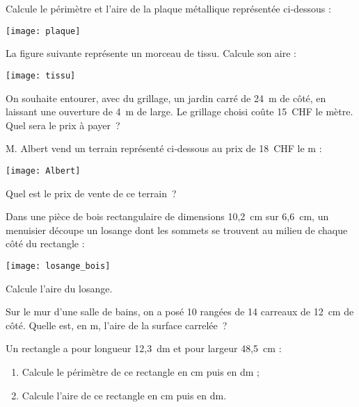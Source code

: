 \begin{exercice}
Calcule le périmètre et l'aire de la plaque métallique représentée ci‑dessous :
\begin{center} \texttt{[image: plaque]} \end{center}
\end{exercice}


\begin{exercice}
La figure suivante représente un morceau de tissu. Calcule son aire :
\begin{center} \texttt{[image: tissu]} \end{center}
\end{exercice}


\begin{exercice}
On souhaite entourer, avec du grillage, un jardin carré de 24 m de côté, en laissant une ouverture de 4 m de large. Le grillage choisi coûte 15 CHF le mètre. Quel sera le prix à payer ?
\end{exercice}


\begin{exercice}
M. Albert vend un terrain représenté ci‑dessous au prix de 18 CHF le m :
\begin{center} \texttt{[image: Albert]} \end{center}
Quel est le prix de vente de ce terrain ?
\end{exercice}


\begin{exercice}
Dans une pièce de bois rectangulaire de dimensions 10,2 cm sur 6,6 cm, un menuisier découpe un losange dont les sommets se trouvent au milieu de chaque côté du rectangle :
\begin{center} \texttt{[image: losange\_bois]} \end{center}
Calcule l'aire du losange.
\end{exercice}


\begin{exercice}
Sur le mur d’une salle de bains, on a posé 10 rangées de 14 carreaux de 12 cm de côté. Quelle est, en m, l’aire de la surface carrelée ?
\end{exercice}


\begin{exercice}
Un rectangle a pour longueur 12,3 dm et pour largeur 48,5 cm :
\begin{enumerate}
 \item Calcule le périmètre de ce rectangle en cm puis en dm ;
 \item Calcule l'aire de ce rectangle en cm puis en dm.
 \end{enumerate}
\end{exercice}



